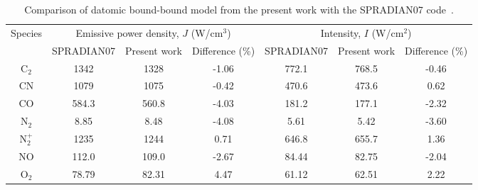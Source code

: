 \begin{table}[h]
 \small
 \center
 \caption{Comparison of datomic bound-bound model from the present work with the SPRADIAN07 code~\cite{hyun_phd}.}
 \label{tab:spradian_diatom_compare}
 \begin{tabular*}{1.0\textwidth}{ccccccc}
  \hline Species                          & \multicolumn{3}{c}{Emissive power density, $J$ (W/cm$^3$)}        & \multicolumn{3}{c}{Intensity, $I$ (W/cm$^2$)}      \\
                                                      & SPRADIAN07 & Present work  & Difference (\%)                     & SPRADIAN07 & Present work & Difference (\%) \\
  \hline  
                  C$_2$                       & 1342             & 1328                 & -1.06                                      & 772.1             & 768.5              & -0.46 \\
                  CN                             & 1079             & 1075                 & -0.42                                      & 470.6              & 473.6             &  0.62 \\
                  CO                             & 584.3            & 560.8                & -4.03                                       & 181.2             & 177.1             & -2.32 \\
                  N$_2$                       & 8.85              & 8.48                  & -4.08                                       & 5.61                & 5.42               & -3.60 \\
                  N$_2^+$                  & 1235             & 1244                 & 0.71                                         & 646.8             & 655.7            & 1.36 \\
                  NO                             & 112.0            & 109.0                & -2.67                                       & 84.44             & 82.75             & -2.04 \\
                  O$_2$                      & 78.79             & 82.31                & 4.47                                        & 61.12             & 62.51             &  2.22 \\
  \hline
 \end{tabular*}
\end{table}

